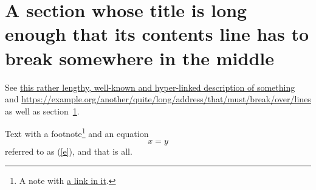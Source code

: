 \documentclass{article}
\begin{document}
\tableofcontents
\section{A section whose title is long enough that its contents line has to break somewhere in the middle}\label{s1}
\begin{minipage}{12em}
See \href{https://example.org/a/very/long/path}{this rather lengthy, well-known and hyper-linked description of something} and
\url{https://example.org/another/quite/long/address/that/must/break/over/lines} as well as section~\ref{s1}.
\end{minipage}

Text with a footnote\footnote{A note with \href{https://n.org}{a link in it}.} and an equation
\begin{equation} x = y \label{e}\end{equation}
referred to as (\ref{e}), and that is all.
\end{document}
